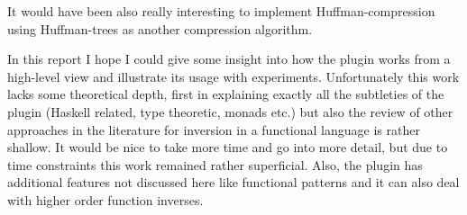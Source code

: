 \documentclass[12pt,a4paper, dvipsnames,usenames]{article}
\begin{document}
It would have been also really interesting to implement Huffman-compression
using Huffman-trees as another compression algorithm.

In this report I hope I could give some insight into how
the plugin works from a high-level view and illustrate its usage
with experiments.
Unfortunately this work lacks some theoretical depth, first
in explaining exactly all the subtleties of the plugin (Haskell related, type
theoretic, monads etc.) but also the review of other approaches in the literature
for inversion in a functional language is rather shallow. It would be nice
to take more time and go into more detail, but due to time constraints this
work remained rather superficial.
Also, the plugin has additional features not discussed here like functional patterns
and it can also deal with higher order function inverses.





\appendix

\end{document}
